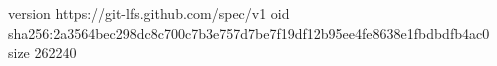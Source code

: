 version https://git-lfs.github.com/spec/v1
oid sha256:2a3564bec298dc8c700c7b3e757d7be7f19df12b95ee4fe8638e1fbdbdfb4ac0
size 262240
